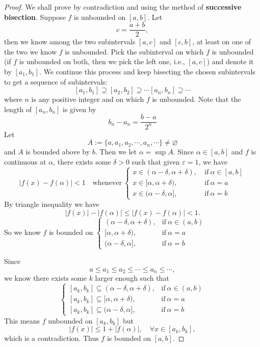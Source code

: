 \documentclass[a4paper]{ctexart}
\begin{document}
	\begin{proof}
		We shall prove by contradiction and using the method of \textbf{successive bisection}. Suppose $f$ is unbounded on $[a,b]$. Let
		\[ c= \frac{a+b}{2},\]
		then we know among the two subintervals $[a,c]$ and $[c,b]$, at least on one of the two we know $f$ is unbounded. Pick the subinterval on which $f$ is unbounded (if $f$ is unbounded on both, then we pick the left one, i.e., $[a,c]$) and denote it by $[a_1,b_1]$. We continue this process and keep bisecting the chosen subintervals to get a sequence of subintervals:
		\[
		[a_1,b_1]\supseteq [a_2,b_2]\supseteq \cdots [a_n,b_n] \supseteq \cdots
		\]
		where $n$ is any positive integer and on which $f$ is unbounded. Note that the length of $[a_n,b_n]$ is given by
		\[
		b_n - a_n = \frac{b-a}{2^n}
		\]
		Let
		\[
		A:=\{a,a_1,a_2,\cdots,a_n,\cdots\}\neq \varnothing
		\]
		and $A$ is bounded above by $b$. Then we let $\alpha=\sup A$. Since $\alpha \in [a,b]$ and $f$ is continuous at $\alpha$, there exists some $\delta>0$ such that given $\varepsilon = 1$, we have
		\[
		|f(x)-f(\alpha)|<1\quad \text{whenever}\ 
		\begin{cases}
		x\in (\alpha-\delta, \alpha + \delta),\ &\text{if}\ \alpha\in [a,b]\\[4pt]
		x \in [\alpha, \alpha + \delta),\ &\text{if}\ \alpha=a\\[4pt]
		x \in (\alpha - \delta, \alpha],\ &\text{if}\ \alpha=b
		\end{cases}
		\]
		By triangle inequality we have
		\[
		|f(x)|-|f(\alpha)| \le |f(x)-f(\alpha)|<1.
		\]
		So we know $f$ is bounded on
		\(
		\begin{cases}
			(\alpha-\delta, \alpha + \delta), & \text{if}\ \alpha\in (a,b)\\[4pt]
			[\alpha, \alpha + \delta), & \text{if}\ \alpha=a\\[4pt]
			(\alpha - \delta, \alpha], & \text{if}\ \alpha=b
		\end{cases}
		\)
		
		\noindent Since
		\[
		a\le a_1 \le a_2 \le \cdots \le a_n \le \cdots,
		\]
		we know there exists some $k$ larger enough such that
		\[
		\begin{cases}
			[a_k,b_k] \subseteq (\alpha-\delta, \alpha + \delta), & \text{if}\ \alpha\in (a,b)\\[4pt]
			[a_k,b_k] \subseteq [\alpha, \alpha + \delta), & \text{if}\ \alpha=a\\[4pt]
			[a_k,b_k] \subseteq (\alpha - \delta, \alpha], & \text{if}\ \alpha=b
		\end{cases}
		\]
		This means $f$ unbounded on $[a_k,b_k]$ but
		\[
		|f(x)| \le 1+|f(\alpha)|,\quad \forall x\in [a_k,b_k],
		\]
		which is a contradiction. Thus $f$ is bounded on $[a,b]$.
	\end{proof}
\end{document}
